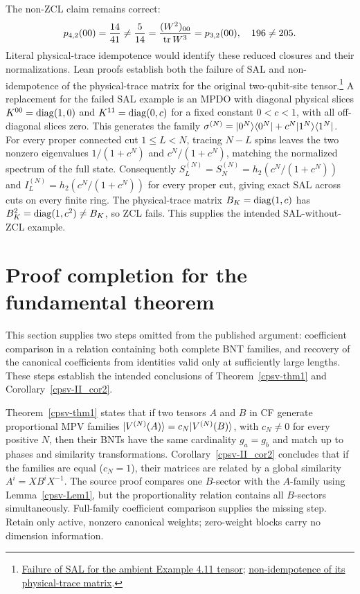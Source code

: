 \documentclass[aps,pra,reprint,nofootinbib,onecolumn]{revtex4-2}
\begin{document}
The non-ZCL claim remains correct:
\begin{align}
	p_{4,2}(00)=\frac{14}{41}
	\ne\frac5{14}
	=\frac{(W^2)_{00}}{\operatorname{tr} W^3}=p_{3,2}(00),
	\quad 196\ne205.
	\label{eq:non-zcl-check}
\end{align}
Literal physical-trace idempotence would identify these reduced
closures and their normalizations. Lean proofs establish both the
failure of SAL and non-idempotence of the physical-trace matrix for the
original two-qubit-site tensor.\footnote{\href{https://sirui-lu.com/TNLean/docs/TNLean/MPS/MPDO/CPSVExample411Entropy.html\#MPOTensor.CPSVExample411Entropy.ambientM_not_isSAL}{Failure of SAL for the ambient Example 4.11 tensor}; \href{https://sirui-lu.com/TNLean/docs/TNLean/MPS/MPDO/CPSVExample411SourceZCL.html\#MPOTensor.CPSVExample411Ambient.physTraceTransfer_ambientM_not_idempotent}{non-idempotence of its physical-trace matrix}.}
A replacement for the failed SAL example is an MPDO
with diagonal physical slices $K^{00}=\operatorname{diag}(1,0)$ and $K^{11}=\operatorname{diag}(0,c)$
for a fixed constant $0<c<1$, with all off-diagonal slices zero.
This generates the family
$\sigma^{(N)}=\lvert0^N\rangle\langle0^N\rvert+c^N\lvert1^N\rangle\langle1^N\rvert$.
For every proper connected cut $1\leq L<N$, tracing $N-L$ spins leaves the
two nonzero eigenvalues $1/(1+c^N)$ and $c^N/(1+c^N)$, matching the normalized
spectrum of the full state. Consequently $S_L^{(N)}=S_N^{(N)}=h_2(c^N/(1+c^N))$
and $I_L^{(N)}=h_2(c^N/(1+c^N))$ for every proper cut, giving exact SAL across
cuts on every finite ring. The physical-trace matrix $B_K=\operatorname{diag}(1,c)$ has
$B_K^2=\operatorname{diag}(1,c^2)\ne B_K$, so ZCL fails. This supplies the intended SAL-without-ZCL example.

\section{Proof completion for the fundamental theorem}\label{sec:matching}

This section supplies two steps omitted from the published argument:
coefficient comparison in a relation containing both complete BNT families,
and recovery of the canonical coefficients from identities valid only at
sufficiently large lengths. These steps establish the intended conclusions
of Theorem~\ref{cpsv-thm1} and Corollary~\ref{cpsv-II_cor2}.

Theorem~\ref{cpsv-thm1} states that if two tensors $A$ and $B$ in CF
generate proportional MPV families
$\lvert V^{(N)}(A)\rangle=c_N\lvert V^{(N)}(B)\rangle$, with $c_N\ne0$ for every
positive $N$, then their BNTs
have the same cardinality $g_a=g_b$ and match up to phases and similarity
transformations. Corollary~\ref{cpsv-II_cor2} concludes that if the
families are equal ($c_N=1$), their matrices are related by a global
similarity $A^i=XB^iX^{-1}$. The source proof compares one $B$-sector
with the $A$-family using Lemma~\ref{cpsv-Lem1}, but the proportionality
relation contains all $B$-sectors simultaneously. Full-family coefficient
comparison supplies the missing step. Retain only active, nonzero canonical
weights; zero-weight blocks carry no dimension information.
\end{document}
